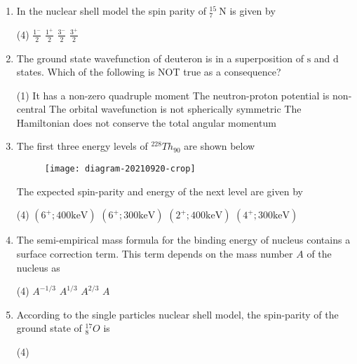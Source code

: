 \begin{enumerate}
	\item In the nuclear shell model the spin parity of ${ }_{7}^{15} \mathrm{~N}$ is given by
	{}
	\begin{tasks}(4)
		\task[\textbf{A.}] $\frac{1^{-}}{2}$
		\task[\textbf{B.}] $\frac{1^{+}}{2}$
		\task[\textbf{C.}] $\frac{3^{-}}{2}$
		\task[\textbf{D.}] $\frac{3^{+}}{2}$
	\end{tasks}
	\item The ground state wavefunction of deuteron is in a superposition of $\mathrm{s}$ and $\mathrm{d}$ states. Which of the following is NOT true as a consequence?
	{}
	\begin{tasks}(1)
		\task[\textbf{A.}]  It has a non-zero quadruple moment
		\task[\textbf{B.}] The neutron-proton potential is non-central
		\task[\textbf{C.}]  The orbital wavefunction is not spherically symmetric
		\task[\textbf{D.}]  The Hamiltonian does not conserve the total angular momentum
	\end{tasks}
	\item The first three energy levels of ${ }^{228} T h_{90}$ are shown below\\
	\begin{figure}[H]
		\centering
		\texttt{[image: diagram-20210920-crop]}
	\end{figure}
	The expected spin-parity and energy of the next level are given by
	{}
	\begin{tasks}(4)
		\task[\textbf{A.}] $\left(6^{+} ; 400 \mathrm{keV}\right)$
		\task[\textbf{B.}] $\left(6^{+} ; 300 \mathrm{keV}\right)$
		\task[\textbf{C.}] $\left(2^{+} ; 400 \mathrm{keV}\right)$
		\task[\textbf{D.}] $\left(4^{+} ; 300 \mathrm{keV}\right)$
	\end{tasks}
	\item The semi-empirical mass formula for the binding energy of nucleus contains a surface correction term. This term depends on the mass number $A$ of the nucleus as
	{}
	\begin{tasks}(4)
		\task[\textbf{A.}] $A^{-1 / 3}$
		\task[\textbf{B.}] $A^{1 / 3}$
		\task[\textbf{C.}]  $A^{2 / 3}$
		\task[\textbf{D.}] $A$
	\end{tasks}
	\item According to the single particles nuclear shell model, the spin-parity of the ground state of ${ }_{8}^{17} O$ is
	{}
	\begin{tasks}(4)

\end{tasks}
\end{enumerate}
